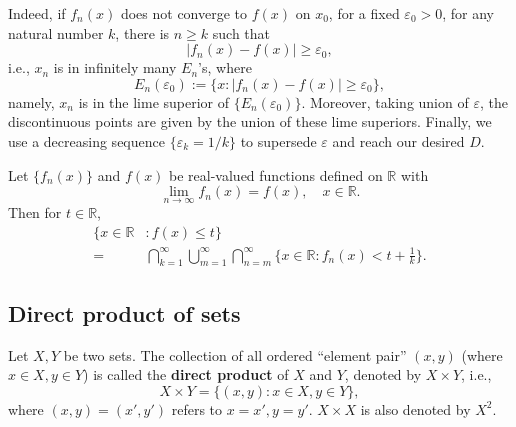 \documentclass[11pt,singlecolumn, openany, citestyle=authoryear]{elegantbook}
\begin{document}
\begin{CJK}{UTF8}{gbsn}
\begin{example}
        Indeed, if $f_n(x)$ does not converge to $f(x)$ on $x_0$, for a fixed $\varepsilon_0>0$,
        for any natural number $k$, there is $n \geqslant k$ such that
        $$
        |f_n(x)-f(x)|\geqslant \varepsilon_0,
        $$
        i.e., $x_n$ is in infinitely many $E_n$'s, where
        $$
        E_n(\varepsilon_0):=\{x:|f_n(x)-f(x)|\geqslant \varepsilon_0\},
        $$
        namely, $x_n$ is in the lime superior of $\{E_n(\varepsilon_0)\}$.
        Moreover, taking union of $\varepsilon$, the discontinuous points are given
        by the union of these lime superiors. Finally, we use a decreasing sequence 
        $\{\varepsilon_k = 1/k\}$ to supersede $\varepsilon$ and reach our desired $D$.
    \end{example}
    
    \begin{example}
        Let $\{f_n(x)\}$ and $f(x)$ be real-valued functions defined on $\mathbb{R}$ with 
        $$
        \lim_{n \to \infty}f_n(x) = f(x),\quad x \in \mathbb{R}.
        $$
        Then for $t \in \mathbb{R}$, 
    \begin{align*}
        \{x \in \mathbb{R}& : f(x)\leqslant t\}\\
        =& \bigcap_{k=1}^\infty \bigcup_{m=1}^\infty \bigcap_{n=m}^\infty
        \{x\in \mathbb{R}:f_n(x)<t + \frac{1}{k}\}.
    \end{align*}
    
    \end{example}
    
    \subsection{Direct product of sets}
    \begin{definition}
        Let $X,Y$ be two sets. The collection of all ordered ``element pair'' $(x,y)$ (where $x\in X,y \in Y$)
        is called the \textbf{direct product} of $X$ and $Y$, denoted by $X \times Y$, i.e.,
        $$
        X \times Y = \{(x,y):x \in X,y \in Y\},
        $$
        where $(x,y) = (x',y')$ refers to $x=x',y=y'$. $X \times X$ is also denoted by 
        $X^2$.
    \end{definition}


\end{CJK}
\end{document}
